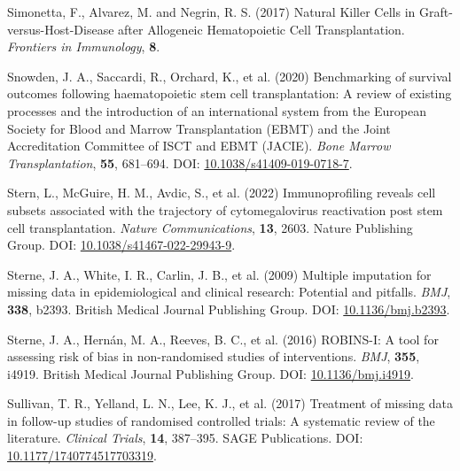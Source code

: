 \documentclass[
  letterpaper,
  DIV=11,
  numbers=noendperiod]{scrreprt}
\newlength{\cslhangindent}
\newlength{\cslentryspacingunit} %
\newenvironment{CSLReferences}[2] %
 {%
  \setlength{\parindent}{0pt}
  \ifodd #1
  \let\oldpar\par
  \def\par{\hangindent=\cslhangindent\oldpar}
  \fi
  \setlength{\parskip}{#2\cslentryspacingunit}
 }%
 {}
\begin{document}
\begin{CSLReferences}{1}{0}
\leavevmode{}%
Simonetta, F., Alvarez, M. and Negrin, R. S. (2017) Natural {Killer
Cells} in {Graft-versus-Host-Disease} after {Allogeneic Hematopoietic
Cell Transplantation}. \emph{Frontiers in Immunology}, \textbf{8}.

\leavevmode{}%
Snowden, J. A., Saccardi, R., Orchard, K., et al. (2020) Benchmarking of
survival outcomes following haematopoietic stem cell transplantation:
{A} review of existing processes and the introduction of an
international system from the {European Society} for {Blood} and {Marrow
Transplantation} ({EBMT}) and the {Joint Accreditation Committee} of
{ISCT} and {EBMT} ({JACIE}). \emph{Bone Marrow Transplantation},
\textbf{55}, 681--694. DOI:
\href{https://doi.org/10.1038/s41409-019-0718-7}{10.1038/s41409-019-0718-7}.

\leavevmode{}%
Stern, L., McGuire, H. M., Avdic, S., et al. (2022) Immunoprofiling
reveals cell subsets associated with the trajectory of cytomegalovirus
reactivation post stem cell transplantation. \emph{Nature
Communications}, \textbf{13}, 2603. Nature Publishing Group. DOI:
\href{https://doi.org/10.1038/s41467-022-29943-9}{10.1038/s41467-022-29943-9}.

\leavevmode{}%
Sterne, J. A., White, I. R., Carlin, J. B., et al. (2009) Multiple
imputation for missing data in epidemiological and clinical research:
Potential and pitfalls. \emph{BMJ}, \textbf{338}, b2393. British Medical
Journal Publishing Group. DOI:
\href{https://doi.org/10.1136/bmj.b2393}{10.1136/bmj.b2393}.

\leavevmode{}%
Sterne, J. A., Hernán, M. A., Reeves, B. C., et al. (2016) {ROBINS-I}: A
tool for assessing risk of bias in non-randomised studies of
interventions. \emph{BMJ}, \textbf{355}, i4919. British Medical Journal
Publishing Group. DOI:
\href{https://doi.org/10.1136/bmj.i4919}{10.1136/bmj.i4919}.

\leavevmode{}%
Sullivan, T. R., Yelland, L. N., Lee, K. J., et al. (2017) Treatment of
missing data in follow-up studies of randomised controlled trials: {A}
systematic review of the literature. \emph{Clinical Trials},
\textbf{14}, 387--395. SAGE Publications. DOI:
\href{https://doi.org/10.1177/1740774517703319}{10.1177/1740774517703319}.


\end{CSLReferences}
\end{document}
